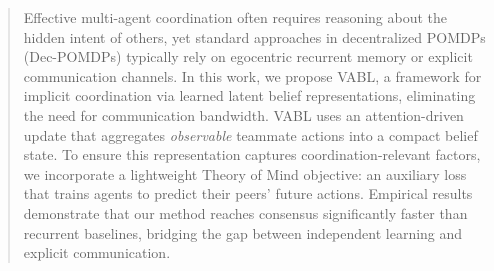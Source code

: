 \documentclass{article}
\theoremstyle{plain}
\theoremstyle{definition}
\theoremstyle{remark}
\begin{document}


\printAffiliationsAndNotice{}  %

\begin{abstract}
Effective multi-agent coordination often requires reasoning about the hidden intent of others, yet standard approaches in decentralized POMDPs (Dec-POMDPs) typically rely on egocentric recurrent memory or explicit communication channels. In this work, we propose VABL, a framework for implicit coordination via learned latent belief representations, eliminating the need for communication bandwidth. VABL uses an attention-driven update that aggregates \emph{observable} teammate actions into a compact belief state. To ensure this representation captures coordination-relevant factors, we incorporate a lightweight Theory of Mind objective: an auxiliary loss that trains agents to predict their peers' future actions. Empirical results demonstrate that our method reaches consensus significantly faster than recurrent baselines, bridging the gap between independent learning and explicit communication.
\end{abstract}
\end{document}

